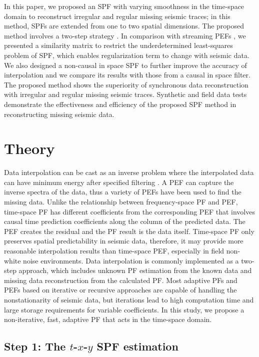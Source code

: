 In this paper, we proposed an SPF with varying smoothness in the
time-space domain to reconstruct irregular and regular missing seismic
traces; in this method, SPFs are extended from one to two spatial
dimensions. The proposed method involves a two-step strategy
\cite[]{Claerbout92,Crawley99}. In comparison with streaming PEFs
\cite[]{Fomel16}, we presented a similarity matrix to restrict the
underdetermined least-squares problem of SPF, which enables
regularization term to change with seismic data. We also designed a
non-causal in space SPF to further improve the accuracy of
interpolation and we compare its results with those from a causal in
space filter. The proposed method shows the superiority of synchronous
data reconstruction with irregular and regular missing seismic
traces. Synthetic and field data tests demonstrate the effectiveness
and efficiency of the proposed SPF method in reconstructing missing
seismic data.

\section{Theory}
Data interpolation can be cast as an inverse problem where the
interpolated data can have minimum energy after specified filtering
\cite[]{Claerbout92}. A PEF can capture the inverse spectra of the
data, thus a variety of PEFs have been used to find the missing
data. Unlike the relationship between frequency-space PF and PEF,
time-space PF has different coefficients from the corresponding PEF
that involves causal time prediction coefficients along the column of
the predicted data. The PEF creates the residual and the PF result is
the data itself. Time-space PF only preserves spatial predictability
in seismic data, therefore, it may provide more reasonable
interpolation results than time-space PEF, especially in field
non-white noise environments. Data interpolation is commonly
implemented as a two-step approach, which includes unknown PF
estimation from the known data and missing data reconstruction from
the calculated PF. Most adaptive PFs and PEFs based on iterative or
recursive approaches are capable of handling the nonstationarity of
seismic data, but iterations lead to high computation time and large
storage requirements for variable coefficients. In this study, we
propose a non-iterative, fast, adaptive PF that acts in the time-space
domain.

\subsection{Step 1: The $t$-$x$-$y$ SPF estimation}

